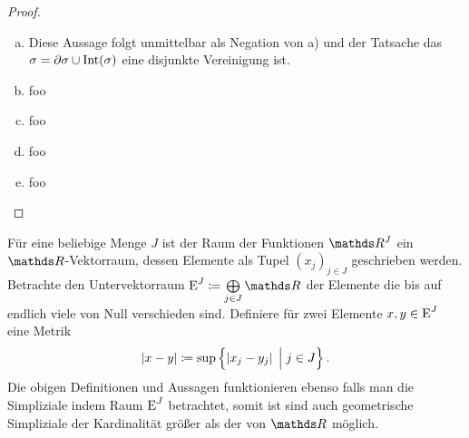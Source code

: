 \begin{Satz}
\begin{proof}
\begin{enumerate}[a):]
    \item Diese Aussage folgt unmittelbar als Negation von a) und der
      Tatsache das $\sigma = \partial\sigma \cup \operatorname{Int}(\sigma)$ eine
      disjunkte Vereinigung ist.
    \item foo
    \item foo
    \item foo
    \item foo
    \end{enumerate}
  \end{proof}
\end{Satz}


\begin{Bem}
  Für eine beliebige Menge $J$ ist der Raum der Funktionen $\R^J$ ein
  $\R$-Vektorraum, dessen Elemente als Tupel $(x_j)_{j \in J}$
  geschrieben werden. Betrachte den Untervektorraum
  $\E^J \coloneqq \bigoplus\limits_{j \in J} \R$ der Elemente die bis
  auf endlich viele von Null verschieden sind. Definiere für zwei
  Elemente $x,y \in \operatorname{E}^J$ eine Metrik
  \begin{gather*}
    \left| x-y \right| \coloneqq \sup \left\{  \left| x_j - y_j  \right|  \; \Big| \;  j \in J \right\}.
  \end{gather*}
  Die obigen Definitionen und Aussagen funktionieren ebenso falls man
  die Simpliziale indem Raum $\operatorname{E}^J$ betrachtet, somit ist sind 
  auch geometrische Simpliziale der Kardinalität größer als der von $\R$
  möglich.
\end{Bem}




